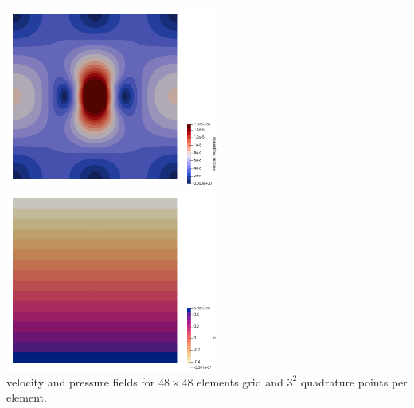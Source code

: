 \begin{center}
\includegraphics[width=7cm]{python_codes/fieldstone_18/results/block/FS/vel}
\includegraphics[width=7cm]{python_codes/fieldstone_18/results/block/FS/press}\\
{\captionfont velocity and pressure fields for $48\times 48$ elements grid and $3^2$
quadrature points per element.}
\end{center}


